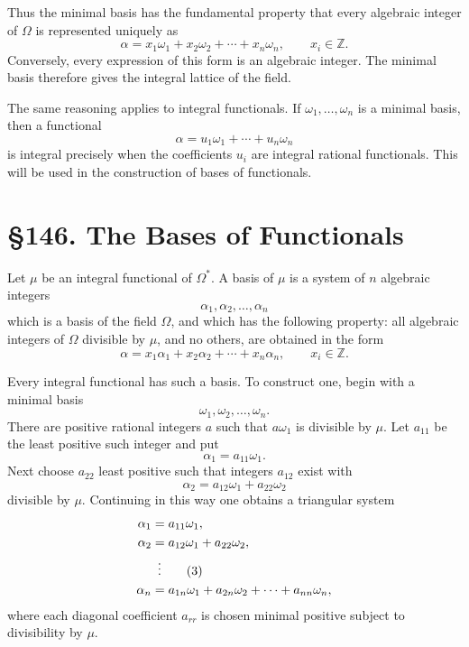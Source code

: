 \documentclass[12pt,a4paper]{article}
\newcommand{\webersection}[2]{\clearpage\section*{\S #1. #2}}
\begin{document}
Thus the minimal basis has the fundamental property that every algebraic integer of \(\Omega\) is represented uniquely as
\begin{equation}
 \alpha=x_1\omega_1+x_2\omega_2+
\cdots+x_n\omega_n,
\qquad x_i\in\mathbb Z. \tag{1}
\end{equation}
Conversely, every expression of this form is an algebraic integer.  The minimal basis therefore gives the integral lattice of the field.

The same reasoning applies to integral functionals.  If \(\omega_1,
\ldots,
\omega_n\) is a minimal basis, then a functional
\[
 \alpha=u_1\omega_1+
\cdots+u_n\omega_n
\]
is integral precisely when the coefficients \(u_i\) are integral rational functionals.  This will be used in the construction of bases of functionals.

\webersection{146}{The Bases of Functionals}

Let \(\mu\) be an integral functional of \(\Omega^*\).  A basis of \(\mu\) is a system of \(n\) algebraic integers
\begin{equation}
 \alpha_1,
\alpha_2,
\ldots,
\alpha_n \tag{1}
\end{equation}
which is a basis of the field \(\Omega\), and which has the following property: all algebraic integers of \(\Omega\) divisible by \(\mu\), and no others, are obtained in the form
\begin{equation}
 \alpha=x_1\alpha_1+x_2\alpha_2+
\cdots+x_n\alpha_n,
\qquad x_i\in\mathbb Z. \tag{2}
\end{equation}

Every integral functional has such a basis.  To construct one, begin with a minimal basis
\[
 \omega_1,
\omega_2,
\ldots,
\omega_n.
\]
There are positive rational integers \(a\) such that \(a\omega_1\) is divisible by \(\mu\).  Let \(a_{11}\) be the least positive such integer and put
\[
 \alpha_1=a_{11}\omega_1.
\]
Next choose \(a_{22}\) least positive such that integers \(a_{12}\) exist with
\[
 \alpha_2=a_{12}\omega_1+a_{22}\omega_2
\]
divisible by \(\mu\).  Continuing in this way one obtains a triangular system
\begin{align}
 \alpha_1&=a_{11}\omega_1,\notag\\
 \alpha_2&=a_{12}\omega_1+a_{22}\omega_2,\notag\\
 &\ \,\vdots \tag{3}\\
 \alpha_n&=a_{1n}\omega_1+a_{2n}\omega_2+
\cdots+a_{nn}\omega_n,
\notag
\end{align}
where each diagonal coefficient \(a_{rr}\) is chosen minimal positive subject to divisibility by \(\mu\).
\end{document}
